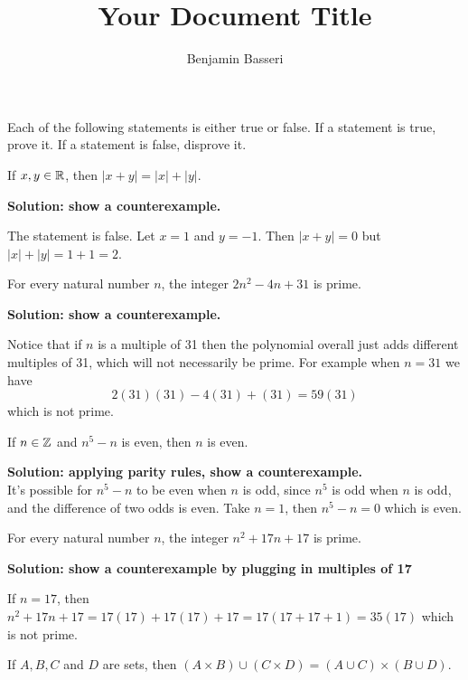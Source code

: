 \documentclass{article}
\title{Your Document Title}
\author{Benjamin Basseri}
\begin{document}
\maketitle

Each of the following statements is either true or false. If a statement is true, prove it. If a statement is false, disprove it.

\begin{problem}
If $x, y \in \mathbb{R}$, then $|x + y| = |x| + |y|$.
\end{problem}

\textbf{Solution: show a counterexample.}

The statement is false. Let $x = 1$ and $y = -1$. Then $|x + y| = 0$ but $|x| + |y| = 1 + 1 = 2$.

\begin{problem}
For every natural number $n$, the integer $2n^2 - 4n + 31$ is prime.
\end{problem}

\textbf{Solution: show a counterexample.}

Notice that if $n$ is a multiple of 31 then the polynomial overall just adds different multiples of 31, which will not necessarily be prime. For example when $n = 31$ we have
$$2(31)(31) - 4(31) + (31) = 59(31)$$
which is not prime.

\begin{problem}
If $n \in \mathbb{Z}$ and $n^5 - n$ is even, then $n$ is even.
\end{problem}

\textbf{Solution: applying parity rules, show a counterexample.}
\\
It's possible for $n^5 - n$ to be even when $n$ is odd, since $n^5$ is odd when $n$ is odd, and the difference of two odds is even. Take $n = 1$, then $n^5 - n = 0$ which is even.

\begin{problem}
For every natural number $n$, the integer $n^2 + 17n + 17$ is prime.
\end{problem}

\textbf{Solution: show a counterexample by plugging in multiples of 17}

If $n = 17$, then $n^2 + 17n + 17 = 17(17) + 17(17) + 17 = 17(17 + 17 + 1) = 35(17)$ which is not prime.

\begin{problem}
If $A, B, C$ and $D$ are sets, then $(A \times B) \cup (C \times D) = (A \cup C) \times (B \cup D)$.
\end{problem}
\end{document}
